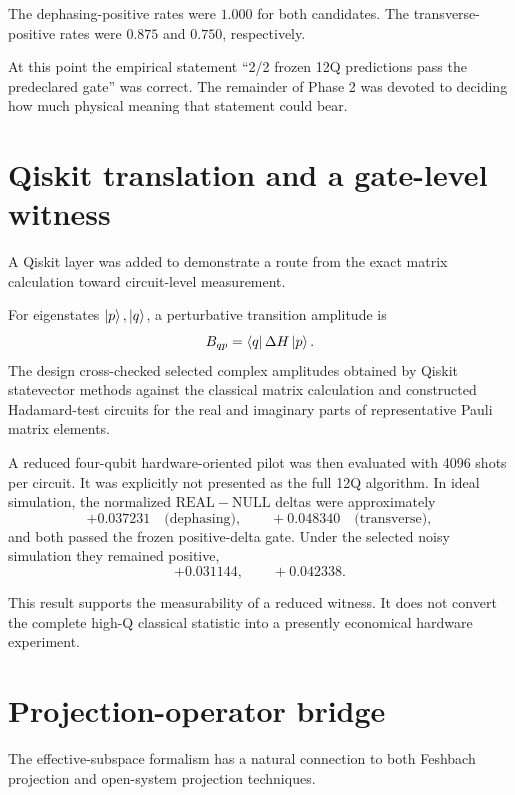 \documentclass[11pt,a4paper]{article}
\newcommand{\Real}{\mathrm{REAL}}
\newcommand{\Null}{\mathrm{NULL}}
\begin{document}
The dephasing-positive rates were \(1.000\) for both candidates.  The
transverse-positive rates were \(0.875\) and \(0.750\), respectively.

At this point the empirical statement ``2/2 frozen 12Q predictions pass the
predeclared gate'' was correct.  The remainder of Phase 2 was devoted to
deciding how much physical meaning that statement could bear.

\section{Qiskit translation and a gate-level witness}

A Qiskit layer was added to demonstrate a route from the exact matrix
calculation toward circuit-level measurement.

For eigenstates \(\ket{p},\ket{q}\), a perturbative transition amplitude is
\[
B_{qp}
=
\bra{q}\Delta H\ket{p}.
\]
The design cross-checked selected complex amplitudes obtained by Qiskit
statevector methods against the classical matrix calculation and constructed
Hadamard-test circuits for the real and imaginary parts of representative
Pauli matrix elements.

A reduced four-qubit hardware-oriented pilot was then evaluated with
4096 shots per circuit.  It was explicitly not presented as the full 12Q
algorithm.  In ideal simulation, the normalized \(\Real-\Null\) deltas were
approximately
\[
+0.037231
\quad\text{(dephasing)},
\qquad
+0.048340
\quad\text{(transverse)},
\]
and both passed the frozen positive-delta gate.  Under the selected noisy
simulation they remained positive,
\[
+0.031144,\qquad +0.042338.
\]

This result supports the measurability of a reduced witness.  It does not
convert the complete high-Q classical statistic into a presently economical
hardware experiment.

\section{Projection-operator bridge}

The effective-subspace formalism has a natural connection to both Feshbach
projection and open-system projection techniques.
\end{document}
